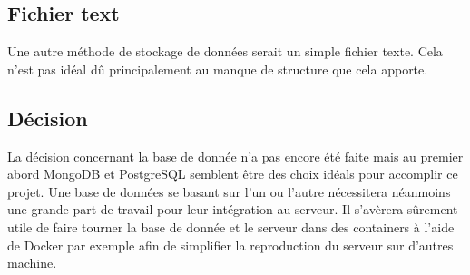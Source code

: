 \subsection{Fichier text}
Une autre méthode de stockage de données serait un simple fichier texte. Cela n'est pas idéal dû principalement au manque de structure que cela apporte.

\subsection{Décision}
La décision concernant la base de donnée n'a pas encore été faite mais au premier abord MongoDB et PostgreSQL semblent être des choix idéals pour accomplir ce projet. Une base de données se basant sur l'un ou l'autre nécessitera néanmoins une grande part de travail pour leur intégration au serveur.
Il s'avèrera sûrement utile de faire tourner la base de donnée et le serveur dans des containers à l'aide de Docker par exemple afin de simplifier la reproduction du serveur sur d'autres machine.
